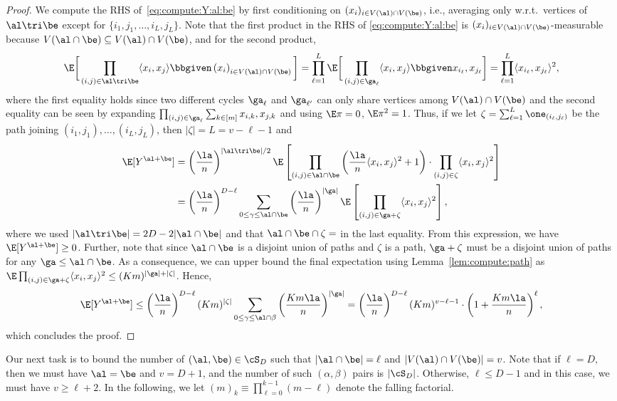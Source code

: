 \documentclass[11pt]{article}
\begin{document}
\begin{proof}
We compute the RHS of~\eqref{eq:compute:Y:al:be} by first conditioning on $(x_i)_{i\in V(\al)\cap V(\be)}$, i.e., averaging only w.r.t.\ vertices of $\al\tri \be$ except for $\{i_1,j_{1},\ldots, i_{L},j_L\}$. Note that the first product in the RHS of \eqref{eq:compute:Y:al:be} is $(x_i)_{i\in V(\al)\cap V(\be)}$-measurable because $V(\al\cap\be)\subseteq V(\al)\cap V(\be)$, and for the second product,
\[
\E\bigg[\prod_{(i,j)\in \al\tri \be}\langle x_i,x_j\rangle\bbgiven \left(x_i\right)_{i\in V(\al)\cap V(\be)}\bigg]=\prod_{\ell=1}^{L}\E\bigg[\prod_{(i,j)\in \ga_\ell}\langle x_i,x_j\rangle \bbgiven x_{i_{\ell}}, x_{j_{\ell}}\bigg]=\prod_{\ell=1}^{L}\langle x_{i_{\ell}}, x_{j_{\ell}}\rangle ^2,
\]
where the first equality holds since two different cycles $\ga_{\ell}$ and $\ga_{\ell'}$ can only share vertices among $V(\al)\cap V(\be)$ and the second equality can be seen by expanding $\prod_{(i,j)\in \ga_\ell} \sum_{k \in [m]} x_{i,k},x_{j,k}$ and using $\E \pi=0$, $\E\pi^2=1$. Thus, if we let $\zeta=\sum_{\ell=1}^{L}\one_{(i_{\ell},j_{\ell})}$ be the path joining $(i_1,j_1),\ldots ,(i_L,j_L)$, then $|\zeta|=L=v-\ell-1$ and 
\[
\begin{split}
\E[Y^{\al+\be}]
&=\left(\frac{\la}{n}\right)^{|\al\tri \be|/2}\E\left[\prod_{(i,j)\in \al\cap \be}\left(\frac{\la}{n}\langle x_i,x_j\rangle^2+1\right)\cdot\prod_{(i,j)\in \zeta}\langle x_i,x_j\rangle^2\right]\\
&=\left(\frac{\la}{n}\right)^{D-\ell}\sum_{0\leq \gamma\leq \al \cap\be} \left(\frac{\la}{n}\right)^{|\ga|}\E\left[\prod_{(i,j)\in \ga+\zeta}\langle x_i,x_j\rangle^2\right],
\end{split}
\]
where we used $|\al\tri \be|=2D-2|\al\cap\be|$ and that $\al\cap\be\cap \zeta=\empty$ in the last equality. From this expression, we have $\E[Y^{\al+\be}]\geq 0$. Further, note that since $\al\cap \be$ is a disjoint union of paths and $\zeta$ is a path, $\ga+\zeta$ must be a disjoint union of paths for any $\ga\le \al\cap\be$. As a consequence, we can upper bound the final expectation using Lemma~\ref{lem:compute:path} as $\E \prod_{(i,j)\in \ga+\zeta}\langle x_i,x_j\rangle^2\leq (Km)^{|\ga|+|\zeta|}$. Hence, 
\[
\E[Y^{\al+\be}]\leq \left(\frac{\la}{n}\right)^{D-\ell}(Km)^{|\zeta|}\sum_{0\leq \gamma\leq \al\cap\beta}\left(\frac{Km\la}{n}\right)^{|\ga|}=\left(\frac{\la}{n}\right)^{D-\ell}(Km)^{v-\ell-1}\cdot\left(1+\frac{Km\la}{n}\right)^{\ell},
\]
which concludes the proof.
\end{proof}

Our next task is to bound the number of $(\al,\be)\in \cS_D$ such that $|\al\cap\be|=\ell$ and $|V(\al)\cap V(\be)|=v$. Note that if $\ell=D$, then we must have $\al=\be$ and $v=D+1$, and the number of such $(\alpha,\beta)$ pairs is $|\cS_D|$. Otherwise, $\ell\leq D-1$ and in this case, we must have $v\geq \ell+2$. In the following, we let $(m)_{k}\equiv \prod_{\ell=0}^{k-1}(m-\ell)$ denote the falling factorial.
\end{document}

